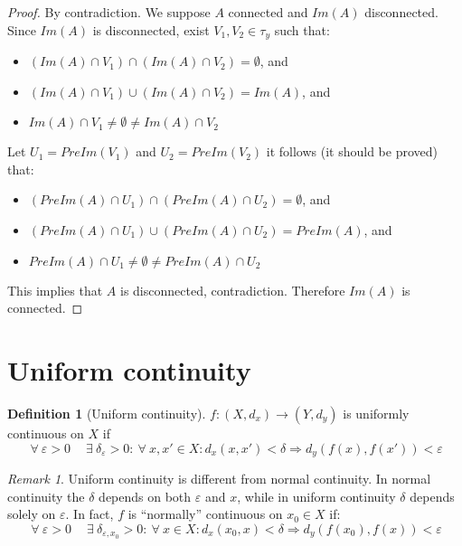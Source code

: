 \documentclass{article}
\newcommand{\Ar}{\Rightarrow}
\newcommand{\f}[3]{#1 : #2 \rightarrow #3}
\theoremstyle{definition}
\newtheorem{definition}{Definition}[section]
\theoremstyle{definition}
\theoremstyle{plain}
\theoremstyle{plain}
\theoremstyle{plain}
\theoremstyle{plain}
\theoremstyle{definition}
\theoremstyle{remark}
\theoremstyle{remark}
\theoremstyle{remark}
\theoremstyle{remark}
\newtheorem*{remark}{Remark}
\newcommand{\ForAll}{\ \forall \ }
\newcommand{\Exists}{\ \exists \ }
\newcommand{\E}{\varepsilon}
\begin{document}
\begin{proof}
  By contradiction. We suppose $A$ connected and $Im(A)$ disconnected. Since $Im(A)$ is disconnected, exist $V_1, V_2 \in \tau_y$ such that:
  \begin{itemize}
    \item $(Im(A) \cap V_1) \cap (Im(A) \cap V_2) = \emptyset$, and
    \item $(Im(A) \cap V_1) \cup (Im(A) \cap V_2) = Im(A)$, and
    \item $Im(A) \cap V_1 \neq \emptyset \neq Im(A) \cap V_2$
  \end{itemize}
  Let $U_1 = PreIm(V_1)$ and $U_2 = PreIm(V_2)$ it follows (it should be proved) that:
  \begin{itemize}
    \item $(PreIm(A) \cap U_1) \cap (PreIm(A) \cap U_2) = \emptyset$, and
    \item $(PreIm(A) \cap U_1) \cup (PreIm(A) \cap U_2) = PreIm(A)$, and
    \item $PreIm(A) \cap U_1 \neq \emptyset \neq PreIm(A) \cap U_2$
  \end{itemize}
  This implies that $A$ is disconnected, contradiction. Therefore $Im(A)$ is connected.
\end{proof}


\section{Uniform continuity}


\begin{definition}[Uniform continuity]
  $\f{f}{(X,d_x)}{(Y,d_y)}$ is uniformly continuous on $X$ if
  \[
  \ForAll \E > 0 \quad \Exists \delta_\E > 0 : \ForAll x,x' \in X : d_x(x,x')
  < \delta \Ar d_y(f(x),f(x')) < \E
  \]
\end{definition}


\begin{remark}
  Uniform continuity is different from normal continuity. In normal continuity the $\delta$ depends on both $\E$ and $x$, while in uniform continuity $\delta$ depends solely on $\E$. In fact, $f$ is ``normally'' continuous on $x_0 \in X$ if:
  \[
  \ForAll \E > 0 \quad \Exists \delta_{\E,x_0} > 0 : \ForAll x \in X :
  d_x(x_0,x) < \delta \Ar d_y(f(x_0),f(x)) < \E
  \]
\end{remark}
\end{document}
